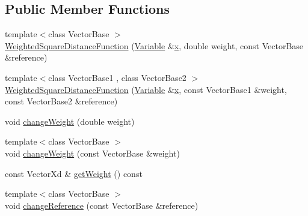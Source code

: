 \subsection*{Public Member Functions}
\begin{DoxyCompactItemize}
\item 
{\footnotesize template$<$class Vector\+Base $>$ }\\\hyperlink{classocra_1_1WeightedSquareDistanceFunction_a25942322441c7bac8adb24d8f1d27905}{Weighted\+Square\+Distance\+Function} (\hyperlink{classocra_1_1Variable}{Variable} \&\hyperlink{classocra_1_1Function_a28825886d1f149c87b112ec2ec1dd486}{x}, double weight, const Vector\+Base \&reference)
\item 
{\footnotesize template$<$class Vector\+Base1 , class Vector\+Base2 $>$ }\\\hyperlink{classocra_1_1WeightedSquareDistanceFunction_a1aca7da80ddc408d8194d32712418b89}{Weighted\+Square\+Distance\+Function} (\hyperlink{classocra_1_1Variable}{Variable} \&\hyperlink{classocra_1_1Function_a28825886d1f149c87b112ec2ec1dd486}{x}, const Vector\+Base1 \&weight, const Vector\+Base2 \&reference)
\item 
void \hyperlink{classocra_1_1WeightedSquareDistanceFunction_aa46e440abf19590ebdc4b72b97c9901d}{change\+Weight} (double weight)
\item 
{\footnotesize template$<$class Vector\+Base $>$ }\\void \hyperlink{classocra_1_1WeightedSquareDistanceFunction_a8001ac136e0c486571e5523d01e6de38}{change\+Weight} (const Vector\+Base \&weight)
\item 
const Vector\+Xd \& \hyperlink{classocra_1_1WeightedSquareDistanceFunction_a830f93e5be8ede8c5cdc18396e89ead3}{get\+Weight} () const
\item 
{\footnotesize template$<$class Vector\+Base $>$ }\\void \hyperlink{classocra_1_1WeightedSquareDistanceFunction_a6a81acd002eb8f7576b0c9ee99e1bc46}{change\+Reference} (const Vector\+Base \&reference)
\end{DoxyCompactItemize}
